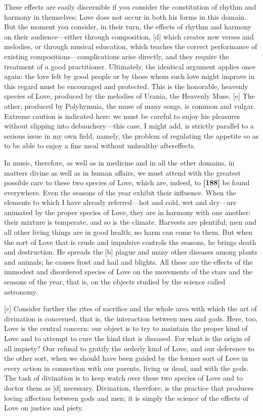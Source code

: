 These effects are easily discernible if you consider the constitution of
rhythm and harmony in themselves; Love does not occur in both his forms
in this domain. But the moment you consider, in their turn, the effects
of rhythm and harmony on their audience---either through composition,
{[}d{]} which creates new verses and melodies, or through musical
education, which teaches the correct performance of existing
compositions---complications arise directly, and they require the
treatment of a good practitioner. Ultimately, the identical argument
applies once again: the love felt by good people or by those whom such
love might improve in this regard must be encouraged and protected. This
is the honorable, heavenly species of Love, produced by the melodies of
Urania, the Heavenly Muse. {[}e{]} The other, produced by Polyhymnia,
the muse of many songs, is common and vulgar. Extreme caution is
indicated here: we must be careful to enjoy his pleasures without
slipping into debauchery---this case, I might add, is strictly parallel
to a serious issue in my own field, namely, the problem of regulating
the appetite so as to be able to enjoy a fine meal without unhealthy
aftereffects.

In music, therefore, as well as in medicine and in all the other
domains, in matters divine as well as in human affairs, we must attend
with the greatest possible care to these two species of Love, which are,
indeed, to {\bf {[}188{]}} be found everywhere. Even the seasons of the
year exhibit their influence. When the elements to which I have already
referred---hot and cold, wet and dry---are animated by the proper
species of Love, they are in harmony with one another: their mixture is
temperate, and so is the climate. Harvests are plentiful; men and all
other living things are in good health; no harm can come to them. But
when the sort of Love that is crude and impulsive controls the seasons,
he brings death and destruction. He spreads the {[}b{]} plague and many
other diseases among plants and animals; he causes frost and hail and
blights. All these are the effects of the immodest and disordered
species of Love on the movements of the stars and the seasons of the
year, that is, on the objects studied by the science called astronomy.

{[}c{]} Consider further the rites of sacrifice and the whole area with
which the art of divination is concerned, that is, the interaction
between men and gods. Here, too, Love is the central concern: our object
is to try to maintain the proper kind of Love and to attempt to cure the
kind that is diseased. For what is the origin of all impiety? Our
refusal to gratify the orderly kind of Love, and our deference to the
other sort, when we should have been guided by the former sort of Love
in every action in connection with our parents, living or dead, and with
the gods. The task of divination is to keep watch over these two species
of Love and to doctor them as {[}d{]} necessary. Divination, therefore,
is the practice that produces loving affection between gods and men; it
is simply the science of the effects of Love on justice and piety.


